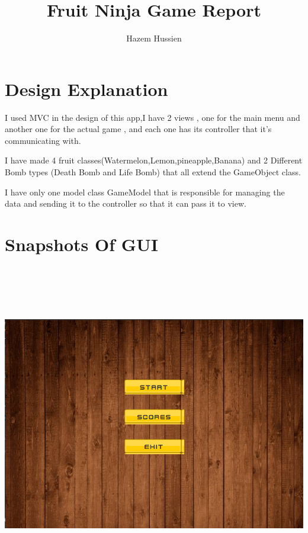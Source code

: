 \documentclass[10pt,a4paper,oneside]{article}
\author{Hazem Hussien}
\title{Fruit Ninja Game Report}
\begin{document}
\maketitle

\newpage
\begin{samepage}
\section{Design Explanation}
I used MVC in the design of this app,I have 2 views , one for the main menu and another one for the actual game , and each one has its controller that it's communicating with.

\vspace{10px}

I have made 4 fruit classes(Watermelon,Lemon,pineapple,Banana) and 2 Different Bomb types (Death Bomb and Life Bomb) that all extend the GameObject class.

I have only one model class GameModel that is responsible for managing the data and sending it to the controller so that it can pass it to view.

\section{Snapshots Of GUI}
\vspace{15px}
\includegraphics[width=15cm,height=14cm,keepaspectratio]{gui1.png}


\end{samepage}
\end{document}
